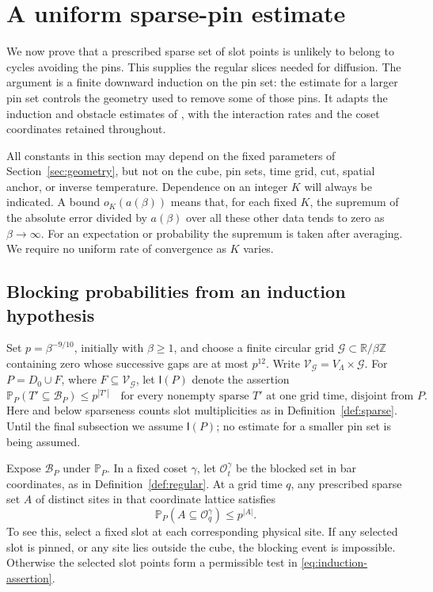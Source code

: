 \section{A uniform sparse-pin estimate}\label{sec:bootstrap}

We now prove that a prescribed sparse set of slot points is unlikely to
belong to cycles avoiding the pins.  This supplies the regular slices
needed for diffusion.  The argument is a finite downward induction on
the pin set: the estimate for a larger pin set controls the geometry
used to remove some of those pins.  It adapts the induction and
obstacle estimates of \cite[Sections~5 and~7]{Ordering}, with the
interaction rates and the coset coordinates retained throughout.

All constants in this section may depend on the fixed parameters of
Section~\ref{sec:geometry}, but not on the cube, pin sets, time grid,
cut, spatial anchor, or inverse temperature.  Dependence on an integer
\(K\) will always be indicated.  A bound \(o_K(a(\beta))\) means that,
for each fixed \(K\), the supremum of the absolute error divided by
\(a(\beta)\) over all these other data tends to zero as
\(\beta\to\infty\).  For an expectation or probability the supremum
is taken after averaging.  We require no uniform rate of convergence
as \(K\) varies.

\subsection{Blocking probabilities from an induction hypothesis}

Set \(p=\beta^{-9/10}\), initially with \(\beta\ge1\), and choose
a finite circular grid \(\mathcal G\subset\mathbb R/\beta\mathbb Z\)
containing zero whose successive gaps are at most \(p^{12}\).
Write \(\mathcal V_{\mathcal G}=V_\Lambda\times\mathcal G\).
For \(P=D_0\cup F\), where \(F\subseteq\mathcal V_{\mathcal G}\),
let \(\mathsf I(P)\) denote the assertion
\begin{equation}\label{eq:induction-assertion}
 \mathbb P_P(T'\subseteq\mathcal B_P)\le p^{|T'|}
 \quad\text{for every nonempty sparse }T'
 \text{ at one grid time, disjoint from }P.
\end{equation}
Here and below sparseness counts slot multiplicities as in
Definition~\ref{def:sparse}.  Until the final subsection we assume
\(\mathsf I(P)\); no estimate for a smaller pin set is being assumed.

Expose \(\mathcal B_P\) under \(\mathbb P_P\).  In a fixed coset
\(\gamma\), let \(\mathcal O_t^\gamma\) be the blocked set in
bar coordinates, as in Definition~\ref{def:regular}.  At a grid
time \(q\), any prescribed sparse set \(A\) of distinct sites in
that coordinate lattice satisfies
\begin{equation}\label{eq:grid-blocking}
 \mathbb P_P(A\subseteq\mathcal O_q^\gamma)\le p^{|A|}.
\end{equation}
To see this, select a fixed slot at each corresponding physical site.
If any selected slot is pinned, or any site lies outside the cube,
the blocking event is impossible.  Otherwise the selected slot
points form a permissible test in \eqref{eq:induction-assertion}.

